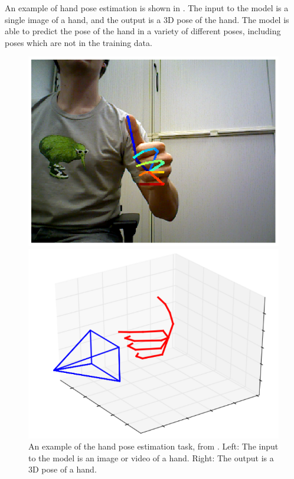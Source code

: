 An example of hand pose estimation is shown in . The input to the model is a single image of a hand, and the output is a 3D pose of the hand. The model is able to predict the pose of the hand in a variety of different poses, including poses which are not in the training data.

\begin{figure}
    \begin{minipage}{0.48\linewidth}
        \includegraphics[width=\linewidth]{figures/hand-pose-1.png}
    \end{minipage}
    \hfill
    \begin{minipage}{0.48\linewidth}
        \includegraphics[width=\linewidth]{figures/hand-pose-2.png}
    \end{minipage}
    \captionsetup{parskip=7pt}
    \caption[Hand pose estimation]{An example of the hand pose estimation task, from \cite{zimmermann2017learning}. Left: The input to the model is an image or video of a hand. Right: The output is a 3D pose of a hand.}
    \hrulefill
    \label{fig:pose-estimation}
\end{figure}

